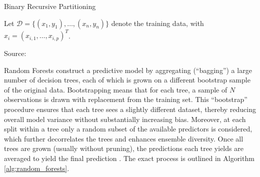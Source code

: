 \begin{algorithm}[H]
    \caption{Binary Recursive Partitioning}
    \label{alg:binary_recursive_partitioning}
    
    Let $\mathcal{D} = \{(x_1, y_1), \ldots, (x_n, y_n)\}$ denote the training data, with $x_i = (x_{i,1}, \ldots, x_{i,p})^T$.
    
    Source: \cite{cutler_2012}
    \end{algorithm}

Random Forests construct a predictive model by aggregating (“bagging”) a large number of decision trees, each of which is grown on a different bootstrap sample of the original data. Bootstrapping means that for each tree, a sample of $N$ observations is drawn with replacement from the training set. This “bootstrap” procedure ensures that each tree sees a slightly different dataset, thereby reducing overall model variance without substantially increasing bias. Moreover, at each split within a tree only a random subset of the available predictors is considered, which further decorrelates the trees and enhances ensemble diversity. Once all trees are grown (usually without pruning), the predictions each tree yields are averaged to yield the final prediction \cite{cutler_2012}. The exact process is outlined in Algorithm \ref{alg:random_forests}. 


